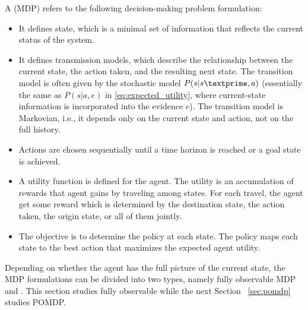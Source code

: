 A  (MDP) refers to the following decision-making problem formulation:
\begin{itemize}
	\item It defines state, which is a minimal set of information that reflects the current status of the system. 
	\item It defines transmission models, which describe the relationship between the current state, the action taken, and the resulting next state. The transition model is often given by the stochastic model $P(s|s\textprime,a)$ (essentially the same as $P(s|a,e)$ in \eqref{eq:expected_utility}, where current-state information is incorporated into the evidence $e$). The transition model is Markovian, i.e., it depends only on the current state and action, not on the full history.
	\item Actions are chosen sequentially until a time horizon is reached or a goal state is achieved.
	\item A utility function is defined for the agent. The utility is an accumulation of rewards that agent gains by traveling among states. For each travel, the agent get some reward which is determined by the destination state, the action taken, the origin state, or all of them jointly.
	\item The objective is to determine the policy at each state. The policy maps each state to the best action that maximizes the expected agent utility.
\end{itemize}

Depending on whether the agent has the full picture of the current state, the MDP formulations can be divided into two types, namely fully observable MDP and . This section studies fully observable while the next Section ~\ref{sec:pomdp} studies POMDP. 


